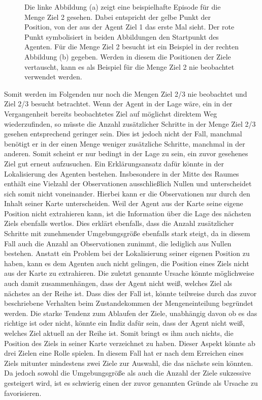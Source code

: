 \begin{figure}[ht!]
\begin{subfigure}[c]{0.5\textwidth}
		\subcaption{}
		\label{sample_visited}
	\end{subfigure}
	\caption{Die linke Abbildung (a) zeigt eine beispielhafte Episode für die Menge \glqq Ziel 2 gesehen\grqq{}. Dabei entspricht der gelbe Punkt der Position, von der aus der Agent Ziel 1 das erste Mal sieht. Der rote Punkt symbolisiert in beiden Abbildungen den Startpunkt des Agenten. Für die Menge \glqq Ziel 2 besucht\grqq{} ist ein Beispiel in der rechten Abbildung (b) gegeben. Werden in diesem die Positionen der Ziele vertauscht, kann es als Beispiel für die Menge \glqq Ziel 2 nie beobachtet\grqq{} verwendet werden.}
\end{figure}

Somit werden im Folgenden nur noch die Mengen \glqq Ziel 2/3 nie beobachtet\grqq{} und \glqq Ziel 2/3 besucht\grqq{} betrachtet. Wenn der Agent in der Lage wäre, ein in der Vergangenheit bereits beobachtetes Ziel auf möglichst direktem Weg wiederzufinden, so müsste die Anzahl zusätzlicher Schritte in der Menge \glqq Ziel 2/3 gesehen\grqq{} entsprechend geringer sein. Dies ist jedoch nicht der Fall, manchmal benötigt er in der einen Menge weniger zusätzliche Schritte, manchmal in der anderen. Somit scheint er nur bedingt in der Lage zu sein, ein zuvor gesehenes Ziel gut erneut aufzusuchen. Ein Erklärungsansatz dafür könnte in der Lokalisierung des Agenten bestehen. Insbesondere in der Mitte des Raumes enthält eine Vielzahl der Observationen ausschließlich Nullen und unterscheidet sich somit nicht voneinander. Hierbei kann er die Observationen nur durch den Inhalt seiner Karte unterscheiden. Weil der Agent aus der Karte seine eigene Position nicht extrahieren kann, ist die Information über die Lage des nächsten Ziels ebenfalls wertlos. Dies erklärt ebenfalls, dass die Anzahl zusätzlicher Schritte mit zunehmender Umgebungsgröße ebenfalls stark steigt, da in diesem Fall auch die Anzahl an Observationen zunimmt, die lediglich aus Nullen bestehen. Anstatt ein Problem bei der Lokalisierung seiner eigenen Position zu haben, kann es dem Agenten auch nicht gelingen, die Position eines Ziels nicht aus der Karte zu extrahieren. Die zuletzt genannte Ursache könnte möglichweise auch damit zusammenhängen, dass der Agent nicht weiß, welches Ziel als nächstes an der Reihe ist. Dass dies der Fall ist, könnte teilweise durch das zuvor beschriebene Verhalten beim Zustandekommen der Mengeneinteilung begründet werden. Die starke Tendenz zum Ablaufen der Ziele, unabhängig davon ob es das richtige ist oder nicht, könnte ein Indiz dafür sein, dass der Agent nicht weiß, welches Ziel aktuell an der Reihe ist. Somit bringt es ihm auch nichts, die Position des Ziels in seiner Karte verzeichnet zu haben. Dieser Aspekt könnte ab drei Zielen eine Rolle spielen. In diesem Fall hat er nach dem Erreichen eines Ziels mitunter mindestens zwei Ziele zur Auswahl, die das nächste sein könnten. Da jedoch sowohl die Umgebungsgröße als auch die Anzahl der Ziele sukzessive gesteigert wird, ist es schwierig einen der zuvor genannten Gründe als Ursache zu favorisieren.

